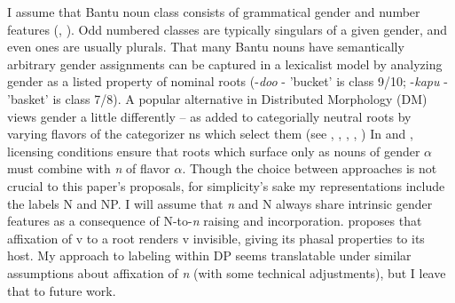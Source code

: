 \documentclass[output=paper
,modfonts
,nonflat]{langsci/langscibook}
\begin{document}
I assume that Bantu noun class consists of grammatical gender and number features (\citealt{Corbett1991}, \citealt{Carstens1991}). Odd numbered classes are typically singulars of a given gender, and even ones are usually plurals. That many Bantu nouns have semantically arbitrary gender assignments can be captured in a lexicalist model by analyzing gender as a listed property of nominal roots (-\textit{doo} - 'bucket' is class 9/10; -\textit{kapu} - 'basket' is class 7/8). A popular alternative in Distributed Morphology (DM) views gender a little differently -- as added to categorially neutral roots by varying flavors of the categorizer ns which select them (see \citealt{Acquaviva2009}, \citealt{Ferrari2005}, \citealt{Kramer2015}, \citealt{Kihm2005}, \citealt{Lecarme2002}) In \citet{Acquaviva2009} and \citet{Kramer2015}, licensing conditions ensure that roots which surface only as nouns of gender $\alpha$ must combine with \textit{n} of flavor $\alpha$.  
Though the choice between approaches is not crucial to this paper's proposals, for simplicity's sake my representations include the labels N and NP. I will assume that \textit{n} and N always share intrinsic gender features as a consequence of N-to-\textit{n} raising and incorporation. \citet{Chomsky2015} proposes that affixation of v to a root renders v invisible, giving its phasal properties to its host. My approach to labeling within DP seems translatable under similar assumptions about affixation of \textit{n} (with some technical adjustments), but I leave that to future work. 
\end{document}
